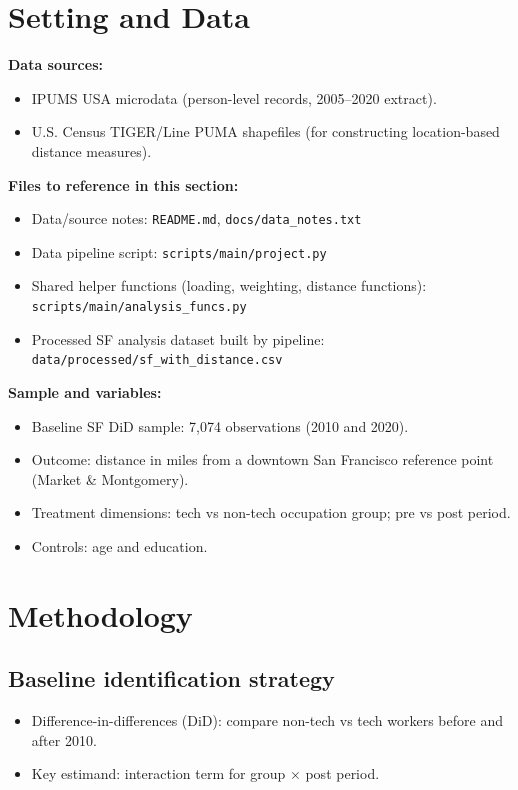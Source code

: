 \documentclass[12pt]{article}
\begin{document}
\section{Setting and Data}
\textbf{Data sources:}
\begin{itemize}[leftmargin=*]
\item IPUMS USA microdata (person-level records, 2005--2020 extract).
\item U.S. Census TIGER/Line PUMA shapefiles (for constructing location-based distance measures).
\end{itemize}

\textbf{Files to reference in this section:}
\begin{itemize}[leftmargin=*]
\item Data/source notes: \texttt{README.md}, \texttt{docs/data\_notes.txt}
\item Data pipeline script: \texttt{scripts/main/project.py}
\item Shared helper functions (loading, weighting, distance functions): \texttt{scripts/main/analysis\_funcs.py}
\item Processed SF analysis dataset built by pipeline: \texttt{data/processed/sf\_with\_distance.csv}
\end{itemize}

\textbf{Sample and variables:}
\begin{itemize}[leftmargin=*]
\item Baseline SF DiD sample: 7,074 observations (2010 and 2020).
\item Outcome: distance in miles from a downtown San Francisco reference point (Market \& Montgomery).
\item Treatment dimensions: tech vs non-tech occupation group; pre vs post period.
\item Controls: age and education.
\end{itemize}

\section{Methodology}
\subsection*{Baseline identification strategy}
\begin{itemize}[leftmargin=*]
\item Difference-in-differences (DiD): compare non-tech vs tech workers before and after 2010.
\item Key estimand: interaction term for group $\times$ post period.
\end{itemize}
\end{document}
